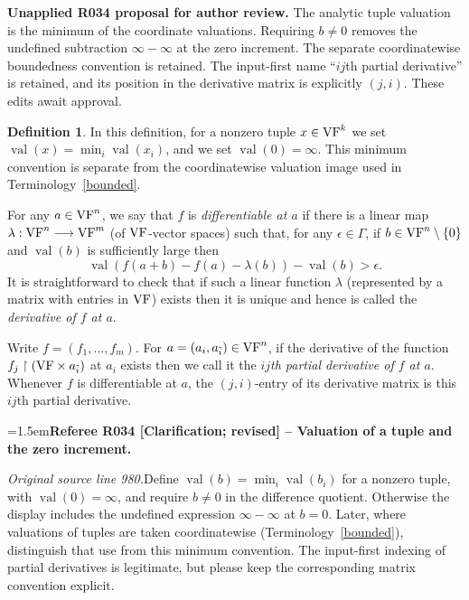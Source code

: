 \documentclass[12pt]{amsart}
\newcommand{\RefereeRemark}[4]{%
  \par\medskip\begingroup\normalfont\small\color{RefereePurple}%
  \emergencystretch=1.5em\noindent\textbf{Referee R#1 [#2] -- #3.}\par\nobreak\noindent #4\par
  \endgroup\medskip
}
\newcommand{\memph}[1]{{\color{magenta}\emph{#1}}}
\theoremstyle{plain}
\theoremstyle{definition}
\newtheorem{defn}[thm]{Definition}
\theoremstyle{remark}
\numberwithin{equation}{section}
\theoremstyle{plain}
\newcommand{\VF}{\textup{VF}}
\newcommand{\0}{\emptyset}
\newcommand{\rest}{\upharpoonright}
\newcommand{\fun}{\longrightarrow}
\DeclareMathOperator{\vv}{val}
\begin{document}
\par\medskip\begingroup\small\color{ResolutionGreen}\noindent\textbf{Unapplied R034 proposal for author review.} The analytic tuple valuation is the minimum of the coordinate valuations. Requiring $b\ne0$ removes the undefined subtraction $\infty-\infty$ at the zero increment. The separate coordinatewise boundedness convention is retained. The input-first name ``$ij$th partial derivative'' is retained, and its position in the derivative matrix is explicitly $(j,i)$. These edits await approval.\par\endgroup\medskip
\begin{defn}\label{defn:diff}
{\color{ResolutionGreen}In this definition, for a nonzero tuple $x\in\VF^k$ we set $\vv(x)=\min_i\vv(x_i)$, and we set $\vv(0)=\infty$. This minimum convention is separate from the coordinatewise valuation image used in Terminology~\ref{bounded}.}


For any $a \in \VF^n$, we say that $f$ is \memph{differentiable at $a$} if there is a linear map $\lambda : \VF^n \fun \VF^m$ (of $\VF$-vector spaces) such that, for any $\epsilon \in \Gamma$, if {\color{ResolutionGreen}$b \in \VF^n\setminus\{0\}$} and $\vv(b)$ is sufficiently large then
\[
\vv(f(a + b) - f(a) - \lambda(b)) - \vv(b) > \epsilon.
\]
It is straightforward to check that if such a linear function $\lambda$ (represented by a matrix with entries in $\VF$) exists then it is unique and hence is called the \memph{derivative of $f$ at $a$}.

Write $f = (f_1, \ldots, f_m)$. For $a = (a_i, a_{\tilde i}) \in \VF^n$, if the derivative of the function $f_j \rest (\VF \times a_{\tilde i})$ at $a_i$ exists then we call it the \memph{$ij$th partial derivative of $f$ at $a$}. {\color{ResolutionGreen}Whenever $f$ is differentiable at $a$, the $(j,i)$-entry of its derivative matrix is this $ij$th partial derivative.}
\end{defn}

\RefereeRemark{034}{Clarification; revised}{Valuation of a tuple and the zero increment}{%
\textit{Original source line 980.}\quad Define $\vv(b)=\min_i\vv(b_i)$ for a nonzero tuple, with $\vv(0)=\infty$, and require $b\ne0$ in the difference quotient. Otherwise the display includes the undefined expression $\infty-\infty$ at $b=0$. Later, where valuations of tuples are taken coordinatewise (Terminology~\ref{bounded}), distinguish that use from this minimum convention. The input-first indexing of partial derivatives is legitimate, but please keep the corresponding matrix convention explicit.
}
\end{document}
